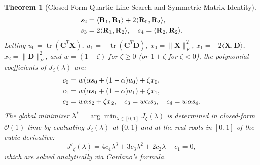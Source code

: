 \documentclass[conference]{IEEEtran}
\newtheorem{theorem}{Theorem}
\begin{document}
\begin{theorem}[Closed-Form Quartic Line Search and Symmetric Matrix Identity]
\begin{align}
s_2 &= \langle \mathbf{R}_1, \mathbf{R}_1 \rangle + 2\langle \mathbf{R}_0, \mathbf{R}_2 \rangle, \notag\\
s_3 &= 2\langle \mathbf{R}_1, \mathbf{R}_2 \rangle, \quad s_4 = \langle \mathbf{R}_2, \mathbf{R}_2 \rangle.
\end{align}
Letting $u_0 = \operatorname{tr}(\mathbf{C}^T\mathbf{X})$, $u_1 = -\operatorname{tr}(\mathbf{C}^T\mathbf{D})$, $x_0 = \|\mathbf{X}\|_F^2$, $x_1 = -2\langle \mathbf{X}, \mathbf{D} \rangle$, $x_2 = \|\mathbf{D}\|_F^2$, and $w = (1 - \zeta)$ for $\zeta \ge 0$ (or $1 + \zeta$ for $\zeta < 0$), the polynomial coefficients of $J_\zeta(\lambda)$ are:
\begin{align}
c_0 &= w(\alpha s_0 + (1-\alpha)u_0) + \zeta x_0, \notag\\
c_1 &= w(\alpha s_1 + (1-\alpha)u_1) + \zeta x_1, \notag\\
c_2 &= w\alpha s_2 + \zeta x_2, \quad c_3 = w\alpha s_3, \quad c_4 = w\alpha s_4.
\end{align}
The global minimizer $\lambda^* = \arg\min_{\lambda \in [0, 1]} J_\zeta(\lambda)$ is determined in closed-form $\mathcal{O}(1)$ time by evaluating $J_\zeta(\lambda)$ at $\{0, 1\}$ and at the real roots in $[0, 1]$ of the cubic derivative:
\begin{equation}
J'_\zeta(\lambda) = 4c_4 \lambda^3 + 3c_3 \lambda^2 + 2c_2 \lambda + c_1 = 0,
\label{eq:cubic_root}
\end{equation}
which are solved analytically via Cardano's formula.
\end{theorem}
\end{document}
